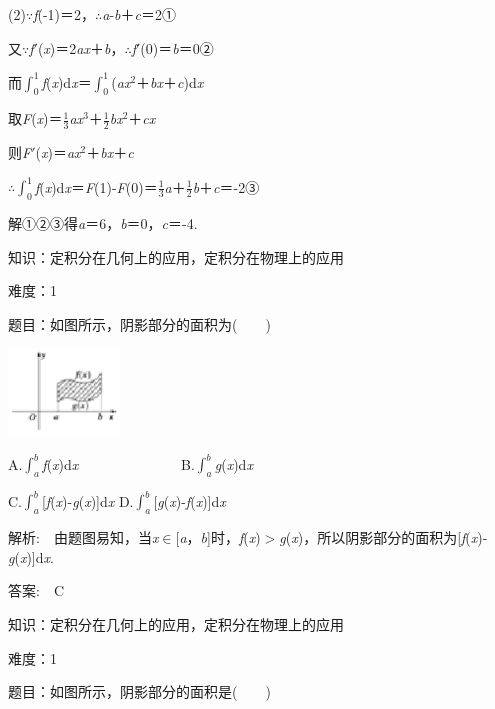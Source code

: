 \documentclass{article} %
\begin{document}
(2)$\mathrm{\because}$\textit{f}(-1)＝2，$\mathrm{\therefore}$\textit{a}-\textit{b}＋\textit{c}＝2①

又$\mathrm{\because}$\textit{f}$'$(\textit{x})＝2\textit{ax}＋\textit{b}，$\mathrm{\therefore}$\textit{f}$'$(0)＝\textit{b}＝0②

而$\int_0^1$\textit{f}(\textit{x})d\textit{x}＝$\int_0^1$(\textit{ax}${}^{2}$＋\textit{bx}＋\textit{c})d\textit{x}

取\textit{F}(\textit{x})＝$\frac{1}{3}$\textit{ax}${}^{3}$＋$\frac{1}{2}$\textit{bx}${}^{2}$＋\textit{cx}

则\textit{F}$'$(\textit{x})＝\textit{ax}${}^{2}$＋\textit{bx}＋\textit{c}

$\mathrm{\therefore}\int_0^1$\textit{f}(\textit{x})d\textit{x}＝\textit{F}(1)-\textit{F}(0)＝$\frac{1}{3}$\textit{a}＋$\frac{1}{2}$\textit{b}＋\textit{c}＝-2③

解①②③得\textit{a}＝6，\textit{b}＝0，\textit{c}＝-4.

 

 

 

 知识：定积分在几何上的应用，定积分在物理上的应用

 难度：1

 题目：如图所示，阴影部分的面积为(　　)

\includegraphics*[width=1.17in, height=0.90in, keepaspectratio=false]{image33}

A.$\int_a^b$\textit{f}(\textit{x})d\textit{x}　　　　　　　  B.$\int_a^b$\textit{g}(\textit{x})d\textit{x}

C.$\int_a^b$[\textit{f}(\textit{x})-\textit{g}(\textit{x})]d\textit{x}     D.$\int_a^b$[\textit{g}(\textit{x})-\textit{f}(\textit{x})]d\textit{x}

 解析:　由题图易知，当\textit{x}$\mathrm{\in}$[\textit{a}，\textit{b}]时，\textit{f}(\textit{x})$\mathrm{>}$\textit{g}(\textit{x})，所以阴影部分的面积为[\textit{f}(\textit{x})-\textit{g}(\textit{x})]d\textit{x}.

 答案:　C



 知识：定积分在几何上的应用，定积分在物理上的应用

 难度：1

 题目：如图所示，阴影部分的面积是(　　)
\end{document}
